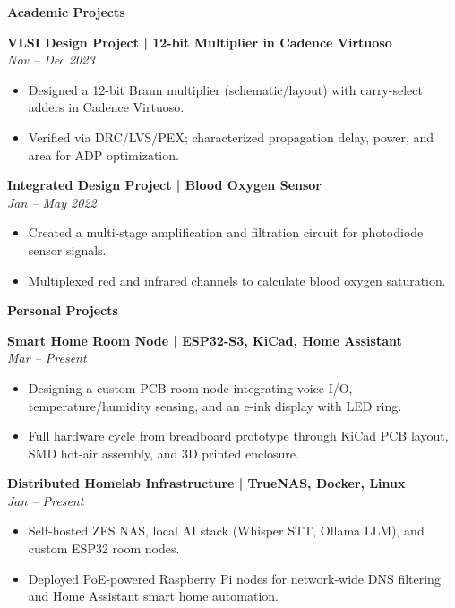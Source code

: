 \documentclass[9pt, letterpaper]{extarticle}
\newenvironment{highlights}{
    \begin{itemize}[
        topsep=0 pt,
        parsep=0 pt,
        partopsep=0pt,
        itemsep=0pt,
        leftmargin=0.25 cm + 10pt
    ]
}{
    \end{itemize}
} %
\begin{document}
    \begin{minipage}[t]{0.48\textwidth}
    \textbf{\large Academic Projects}

    \vspace{4pt}

    \textbf{VLSI Design Project | 12-bit Multiplier in Cadence Virtuoso} \\
    \textit{Nov -- Dec 2023}
    \begin{highlights}
        \item Designed a 12-bit Braun multiplier (schematic/layout) with carry-select adders in Cadence Virtuoso.
        \item Verified via DRC/LVS/PEX; characterized propagation delay, power, and area for ADP optimization.
    \end{highlights}

    \vspace{4pt}

    \textbf{Integrated Design Project | Blood Oxygen Sensor} \\
    \textit{Jan -- May 2022}
    \begin{highlights}
        \item Created a multi-stage amplification and filtration circuit for photodiode sensor signals.
        \item Multiplexed red and infrared channels to calculate blood oxygen saturation.
    \end{highlights}
    \end{minipage}
    \hfill
    \begin{minipage}[t]{0.48\textwidth}
    \textbf{\large Personal Projects}

    \vspace{4pt}

    \textbf{Smart Home Room Node | ESP32-S3, KiCad, Home Assistant} \\
    \textit{Mar -- Present}
    \begin{highlights}
        \item Designing a custom PCB room node integrating voice I/O, temperature/humidity sensing, and an e-ink display with LED ring.
        \item Full hardware cycle from breadboard prototype through KiCad PCB layout, SMD hot-air assembly, and 3D printed enclosure.
    \end{highlights}

    \vspace{4pt}

    \textbf{Distributed Homelab Infrastructure | TrueNAS, Docker, Linux} \\
    \textit{Jan -- Present}
    \begin{highlights}
        \item Self-hosted ZFS NAS, local AI stack (Whisper STT, Ollama LLM), and custom ESP32 room nodes.
        \item Deployed PoE-powered Raspberry Pi nodes for network-wide DNS filtering and Home Assistant smart home automation.
    \end{highlights}
    \end{minipage}
\end{document}
